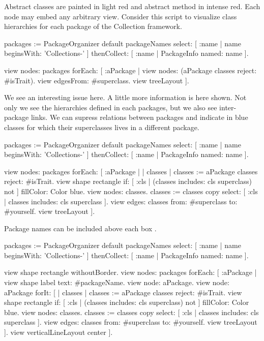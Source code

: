 \documentclass[a4paper,10pt,twoside]{book}
\begin{document}
Abstract classes are painted in light red and abstract method in intense red. 
Each node may embed any arbitrary view. Consider this script to visualize class hierarchies for each package of the Collection framework.

\begin{code}{}
packages := PackageOrganizer default packageNames
        select: [ :name | name beginsWith: 'Collections-' ] 
        thenCollect:  [ :name | PackageInfo named: name ].
        
view nodes: packages forEach: [ :aPackage | 
  view nodes: (aPackage classes reject: #isTrait).
  view edgesFrom: #superclass.
  view treeLayout
].
\end{code}

We see an interesting issue here. A little more information is here shown. Not only we see the hierarchies defined in each packages, but we also see inter-package links. We can supress relations between packages and indicate in blue classes  for which their superclasses lives in a different package.

\begin{code}{}
packages := PackageOrganizer default packageNames
        select: [ :name | name beginsWith: 'Collections-' ] 
        thenCollect:  [ :name | PackageInfo named: name ].
        
view nodes: packages forEach: [ :aPackage | 
  | classes |
  classes := aPackage classes reject: #isTrait.
  view shape rectangle 
    if: [ :cls | (classes includes: cls superclass) not ] fillColor: Color blue.
  view nodes: classes.
  classes := classes copy select: [ :cls | classes includes: cls superclass ].
  view edges: classes from: #superclass to: #yourself.
  view treeLayout
].
\end{code}

Package names can be included above each box .

\begin{code}{}
packages := PackageOrganizer default packageNames
        select: [ :name | name beginsWith: 'Collections-' ] 
        thenCollect:  [ :name | PackageInfo named: name ].

view shape rectangle withoutBorder.
view nodes: packages forEach: [ :aPackage | 
  view shape label text: #packageName.
  view node: aPackage.
  view node: aPackage forIt: [
    | classes |
    classes := aPackage classes reject: #isTrait.
    view shape rectangle 
      if: [ :cls | (classes includes: cls superclass) not ] fillColor: Color blue.
    view nodes: classes.
    classes := classes copy select: [ :cls | classes includes: cls superclass ].
    view edges: classes from: #superclass to: #yourself.
    view treeLayout
  ].
  view verticalLineLayout center
].
\end{code}
\end{document}
